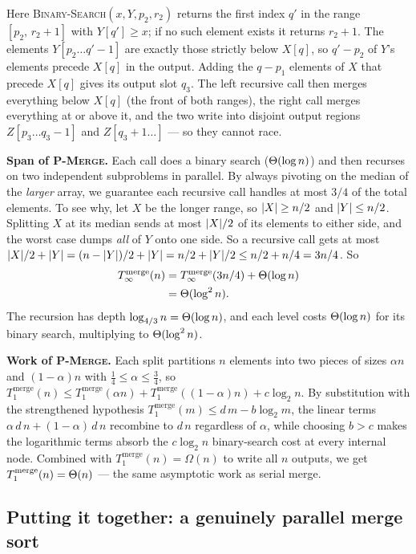 Here \textsc{Binary-Search}$(x, Y, p_2, r_2)$ returns the first index $q'$ in the
range $[p_2,\, r_2+1]$ with $Y[q'] \ge x$; if no such element exists it returns
$r_2+1$. The elements $Y[p_2 \ldots q'-1]$ are exactly those strictly below $X[q]$,
so $q'-p_2$ of $Y$'s elements precede $X[q]$ in the output. Adding the $q-p_1$
elements of $X$ that precede $X[q]$ gives its output slot $q_3$. The left
recursive call then merges everything below $X[q]$ (the front of both ranges), the
right call merges everything at or above it, and the two write into disjoint
output regions $Z[p_3 \ldots q_3-1]$ and $Z[q_3+1 \ldots]$ --- so they cannot
race.

\textbf{Span of \textsc{P-Merge}.} Each call does a binary search ($\Theta(\log n)$)
and then recurses on two independent subproblems in parallel. By always pivoting
on the median of the \emph{larger} array, we guarantee each recursive call handles
at most $3/4$ of the total elements. To see why, let $X$ be the longer range, so
$\lvert X\rvert \ge n/2$ and $\lvert Y\rvert \le n/2$. Splitting $X$ at its median sends at most
$\lvert X\rvert/2$ of its elements to either side, and the worst case dumps \emph{all} of
$Y$ onto one side. So a recursive call gets at most
$\lvert X\rvert/2 + \lvert Y\rvert = (n-\lvert Y\rvert)/2 + \lvert Y\rvert = n/2 + \lvert Y\rvert/2 \le n/2 + n/4 =
3n/4$. So
\begin{align*}
T_\infty^{\text{merge}}(n) &= T_\infty^{\text{merge}}(3n/4) + \Theta(\log n) \\
&= \Theta(\log^2 n).
\end{align*}
The recursion has depth $\log_{4/3} n = \Theta(\log n)$, and each level costs
$\Theta(\log n)$ for its binary search, multiplying to $\Theta(\log^2 n)$.

\textbf{Work of \textsc{P-Merge}.} Each split partitions $n$ elements into two
pieces of sizes $\alpha n$ and $(1-\alpha)n$ with $\tfrac{1}{4} \le \alpha \le
\tfrac{3}{4}$, so
$T_1^{\text{merge}}(n) \le T_1^{\text{merge}}(\alpha n) + T_1^{\text{merge}}((1-\alpha)n) + c\log_2 n$.
By substitution with the strengthened hypothesis $T_1^{\text{merge}}(m) \le d\,m - b\log_2 m$,
the linear terms $\alpha\,d\,n + (1-\alpha)\,d\,n$ recombine to $d\,n$ regardless
of $\alpha$, while choosing $b > c$ makes the logarithmic terms absorb the
$c\log_2 n$ binary-search cost at every internal node. Combined with $T_1^{\text{merge}}(n) = \Omega(n)$
to write all $n$ outputs, we get $T_1^{\text{merge}}(n) = \Theta(n)$ --- the same
asymptotic work as serial merge.

\subsection{Putting it together: a genuinely parallel merge sort}

